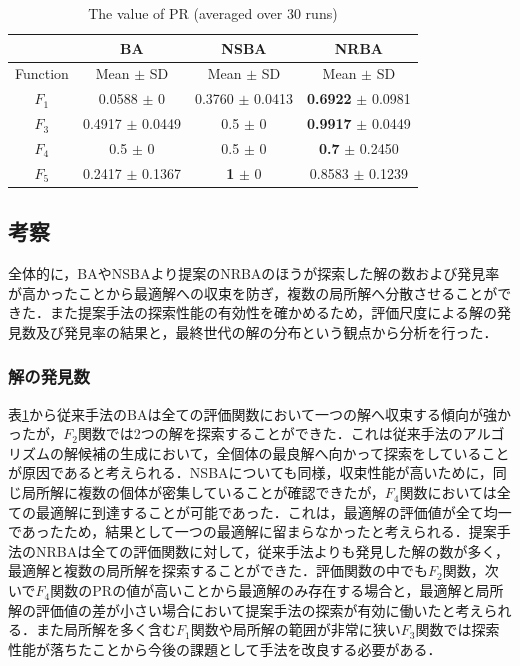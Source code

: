 \documentclass[a4j,11pt]{jarticle}
\begin{document}
\begin{table}[h]
\caption{The value of PR (averaged over 30 runs)}
\begin{center}
\begin{tabular}{c|c|c|c}
\hline
\multicolumn{1}{c|}{} & \multicolumn{1}{c|}{BA} & \multicolumn{1}{c|}{NSBA} & \multicolumn{1}{c}{NRBA}  \\
\hline
Function & Mean $\pm$ SD  & Mean $\pm$ SD &  Mean $\pm$ SD \\
\hline
$F_1$ & 0.0588 $\pm$ 0 & 0.3760 $\pm$ 0.0413 & {\bf 0.6922} $\pm$ 0.0981  \\
\hline
$F_3$ & 0.4917 $\pm$ 0.0449 & 0.5 $\pm$ 0 & {\bf 0.9917} $\pm$ 0.0449 \\
\hline
$F_4$ & 0.5 $\pm$ 0 & 0.5 $\pm$ 0 & {\bf 0.7} $\pm$ 0.2450 \\
\hline
$F_5$ & 0.2417 $\pm$ 0.1367 & {\bf 1} $\pm$ 0 & 0.8583 $\pm$ 0.1239 \\
\hline
\end{tabular}
\label{tab:nrba}
\end{center}
\end{table}

\subsection{考察}
\label{ss:nrba-disc}
全体的に，BAやNSBAより提案のNRBAのほうが探索した解の数および発見率が高かったことから最適解への収束を防ぎ，複数の局所解へ分散させることができた．また提案手法の探索性能の有効性を確かめるため，評価尺度による解の発見数及び発見率の結果と，最終世代の解の分布という観点から分析を行った．


\subsubsection{解の発見数}
\label{sss:nrba-pr} 
表\ref{tab:nrba}から従来手法のBAは全ての評価関数において一つの解へ収束する傾向が強かったが，$F_2$関数では2つの解を探索することができた．これは従来手法のアルゴリズムの解候補の生成において，全個体の最良解へ向かって探索をしていることが原因であると考えられる．NSBAについても同様，収束性能が高いために，同じ局所解に複数の個体が密集していることが確認できたが，$F_4$関数においては全ての最適解に到達することが可能であった．これは，最適解の評価値が全て均一であったため，結果として一つの最適解に留まらなかったと考えられる．提案手法のNRBAは全ての評価関数に対して，従来手法よりも発見した解の数が多く，最適解と複数の局所解を探索することができた．評価関数の中でも$F_2$関数，次いで$F_4$関数のPRの値が高いことから最適解のみ存在する場合と，最適解と局所解の評価値の差が小さい場合において提案手法の探索が有効に働いたと考えられる．また局所解を多く含む$F_1$関数や局所解の範囲が非常に狭い$F_3$関数では探索性能が落ちたことから今後の課題として手法を改良する必要がある．
\end{document}

